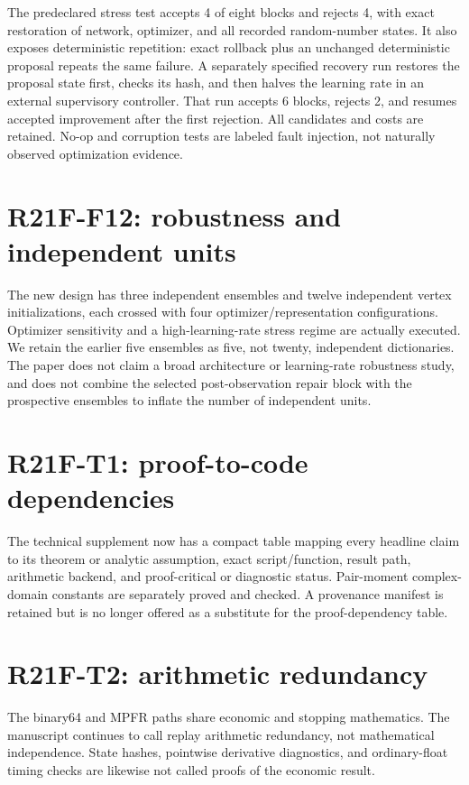 \documentclass[ecta]{econsocart}
\theoremstyle{remark}
\begin{document}
The predeclared stress test accepts 4 of eight blocks and rejects 4, with exact restoration of network, optimizer, and all recorded random-number states. It also exposes deterministic repetition: exact rollback plus an unchanged deterministic proposal repeats the same failure. A separately specified recovery run restores the proposal state first, checks its hash, and then halves the learning rate in an external supervisory controller. That run accepts 6 blocks, rejects 2, and resumes accepted improvement after the first rejection. All candidates and costs are retained. No-op and corruption tests are labeled fault injection, not naturally observed optimization evidence.

\section{R21F-F12: robustness and independent units}

The new design has three independent ensembles and twelve independent vertex initializations, each crossed with four optimizer/representation configurations. Optimizer sensitivity and a high-learning-rate stress regime are actually executed. We retain the earlier five ensembles as five, not twenty, independent dictionaries. The paper does not claim a broad architecture or learning-rate robustness study, and does not combine the selected post-observation repair block with the prospective ensembles to inflate the number of independent units.

\section{R21F-T1: proof-to-code dependencies}

The technical supplement now has a compact table mapping every headline claim to its theorem or analytic assumption, exact script/function, result path, arithmetic backend, and proof-critical or diagnostic status. Pair-moment complex-domain constants are separately proved and checked. A provenance manifest is retained but is no longer offered as a substitute for the proof-dependency table.

\section{R21F-T2: arithmetic redundancy}

The binary64 and MPFR paths share economic and stopping mathematics. The manuscript continues to call replay arithmetic redundancy, not mathematical independence. State hashes, pointwise derivative diagnostics, and ordinary-float timing checks are likewise not called proofs of the economic result.
\end{document}
